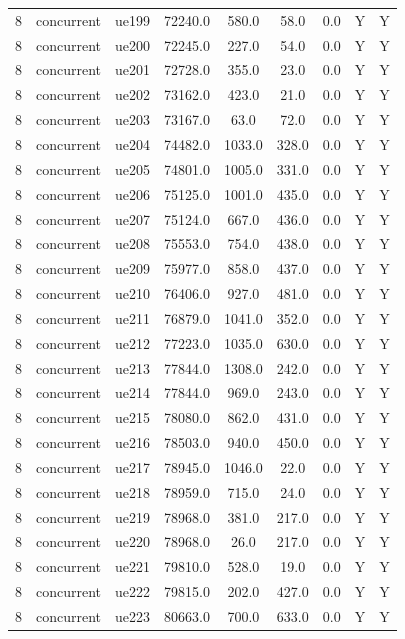 \begin{table}[ht]
\begin{tabular}{|c|c|c|c|c|c|c|c|c|}
8 & concurrent & ue199 & 72240.0 & 580.0 & 58.0 & 0.0 & Y & Y \\
8 & concurrent & ue200 & 72245.0 & 227.0 & 54.0 & 0.0 & Y & Y \\
8 & concurrent & ue201 & 72728.0 & 355.0 & 23.0 & 0.0 & Y & Y \\
8 & concurrent & ue202 & 73162.0 & 423.0 & 21.0 & 0.0 & Y & Y \\
8 & concurrent & ue203 & 73167.0 & 63.0 & 72.0 & 0.0 & Y & Y \\
8 & concurrent & ue204 & 74482.0 & 1033.0 & 328.0 & 0.0 & Y & Y \\
8 & concurrent & ue205 & 74801.0 & 1005.0 & 331.0 & 0.0 & Y & Y \\
8 & concurrent & ue206 & 75125.0 & 1001.0 & 435.0 & 0.0 & Y & Y \\
8 & concurrent & ue207 & 75124.0 & 667.0 & 436.0 & 0.0 & Y & Y \\
8 & concurrent & ue208 & 75553.0 & 754.0 & 438.0 & 0.0 & Y & Y \\
8 & concurrent & ue209 & 75977.0 & 858.0 & 437.0 & 0.0 & Y & Y \\
8 & concurrent & ue210 & 76406.0 & 927.0 & 481.0 & 0.0 & Y & Y \\
8 & concurrent & ue211 & 76879.0 & 1041.0 & 352.0 & 0.0 & Y & Y \\
8 & concurrent & ue212 & 77223.0 & 1035.0 & 630.0 & 0.0 & Y & Y \\
8 & concurrent & ue213 & 77844.0 & 1308.0 & 242.0 & 0.0 & Y & Y \\
8 & concurrent & ue214 & 77844.0 & 969.0 & 243.0 & 0.0 & Y & Y \\
8 & concurrent & ue215 & 78080.0 & 862.0 & 431.0 & 0.0 & Y & Y \\
8 & concurrent & ue216 & 78503.0 & 940.0 & 450.0 & 0.0 & Y & Y \\
8 & concurrent & ue217 & 78945.0 & 1046.0 & 22.0 & 0.0 & Y & Y \\
8 & concurrent & ue218 & 78959.0 & 715.0 & 24.0 & 0.0 & Y & Y \\
8 & concurrent & ue219 & 78968.0 & 381.0 & 217.0 & 0.0 & Y & Y \\
8 & concurrent & ue220 & 78968.0 & 26.0 & 217.0 & 0.0 & Y & Y \\
8 & concurrent & ue221 & 79810.0 & 528.0 & 19.0 & 0.0 & Y & Y \\
8 & concurrent & ue222 & 79815.0 & 202.0 & 427.0 & 0.0 & Y & Y \\
8 & concurrent & ue223 & 80663.0 & 700.0 & 633.0 & 0.0 & Y & Y \\

\end{tabular}
\end{table}
